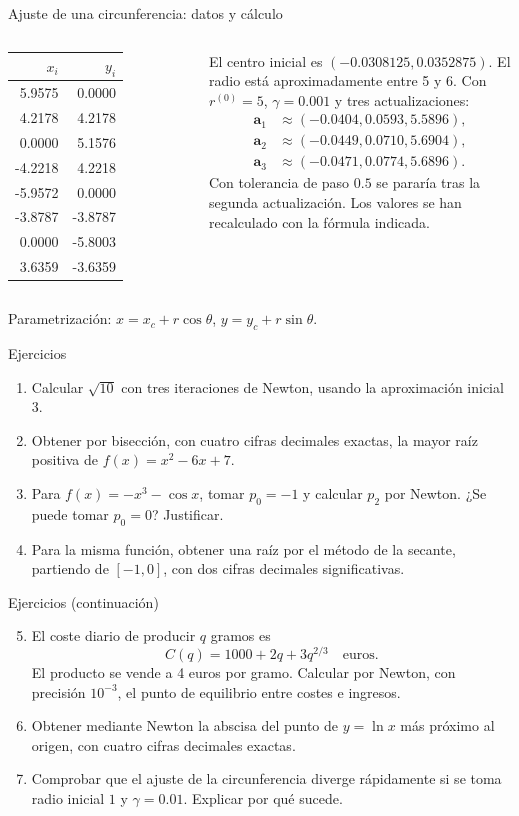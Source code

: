 \documentclass[original_version/main.tex]{subfiles}
\begin{document}
\begin{frame}[t]{Ajuste de una circunferencia: datos y cálculo}
\begin{columns}[T]
\scriptsize
\begin{tabular}{r|r}$x_i$&$y_i$\\\hline
5.9575&0.0000\\4.2178&4.2178\\0.0000&5.1576\\-4.2218&4.2218\\-5.9572&0.0000\\-3.8787&-3.8787\\0.0000&-5.8003\\3.6359&-3.6359
\end{tabular}
\small
El centro inicial es $(-0.0308125,0.0352875)$. El radio está aproximadamente entre 5 y 6.
\medskip
Con $r^{(0)}=5$, $\gamma=0.001$ y tres actualizaciones:
\[\begin{aligned}
\boldsymbol{a}_1&\approx(-0.0404,0.0593,5.5896),\\
\boldsymbol{a}_2&\approx(-0.0449,0.0710,5.6904),\\
\boldsymbol{a}_3&\approx(-0.0471,0.0774,5.6896).
\end{aligned}\]
\scriptsize Con tolerancia de paso $0.5$ se pararía tras la segunda actualización. Los valores se han recalculado con la fórmula indicada.
\end{columns}
\medskip\small Parametrización: $x=x_c+r\cos\theta$, $y=y_c+r\sin\theta$.
\end{frame}
\begin{frame}[t]{Ejercicios}
\small\begin{enumerate}
\item Calcular $\sqrt{10}$ con tres iteraciones de Newton, usando la aproximación inicial $3$.
\item Obtener por bisección, con cuatro cifras decimales exactas, la mayor raíz positiva de $f(x)=x^2-6x+7$.
\item Para $f(x)=-x^3-\cos x$, tomar $p_0=-1$ y calcular $p_2$ por Newton. ¿Se puede tomar $p_0=0$? Justificar.
\item Para la misma función, obtener una raíz por el método de la secante, partiendo de $[-1,0]$, con dos cifras decimales significativas.
\end{enumerate}
\end{frame}
\begin{frame}[t]{Ejercicios (continuación)}
\small\begin{enumerate}\setcounter{enumi}{4}
\item El coste diario de producir $q$ gramos es
\[C(q)=1000+2q+3q^{2/3}\quad\text{euros}.\]
El producto se vende a 4 euros por gramo. Calcular por Newton, con precisión $10^{-3}$, el punto de equilibrio entre costes e ingresos.
\item Obtener mediante Newton la abscisa del punto de $y=\ln x$ más próximo al origen, con cuatro cifras decimales exactas.
\item Comprobar que el ajuste de la circunferencia diverge rápidamente si se toma radio inicial $1$ y $\gamma=0.01$. Explicar por qué sucede.
\end{enumerate}
\end{frame}
\end{document}
